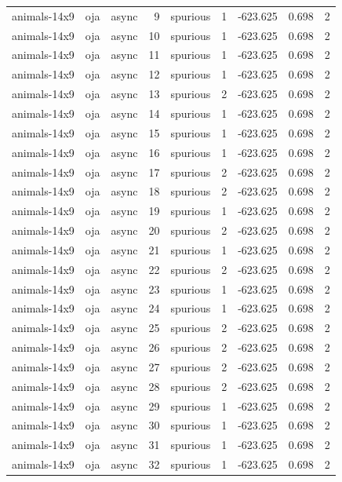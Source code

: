 \begin{tabular}{lllrlrrrr}
animals-14x9 & oja & async & 9 & spurious & 1 & -623.625 & 0.698 & 2 \\
animals-14x9 & oja & async & 10 & spurious & 1 & -623.625 & 0.698 & 2 \\
animals-14x9 & oja & async & 11 & spurious & 1 & -623.625 & 0.698 & 2 \\
animals-14x9 & oja & async & 12 & spurious & 1 & -623.625 & 0.698 & 2 \\
animals-14x9 & oja & async & 13 & spurious & 2 & -623.625 & 0.698 & 2 \\
animals-14x9 & oja & async & 14 & spurious & 1 & -623.625 & 0.698 & 2 \\
animals-14x9 & oja & async & 15 & spurious & 1 & -623.625 & 0.698 & 2 \\
animals-14x9 & oja & async & 16 & spurious & 1 & -623.625 & 0.698 & 2 \\
animals-14x9 & oja & async & 17 & spurious & 2 & -623.625 & 0.698 & 2 \\
animals-14x9 & oja & async & 18 & spurious & 2 & -623.625 & 0.698 & 2 \\
animals-14x9 & oja & async & 19 & spurious & 1 & -623.625 & 0.698 & 2 \\
animals-14x9 & oja & async & 20 & spurious & 2 & -623.625 & 0.698 & 2 \\
animals-14x9 & oja & async & 21 & spurious & 1 & -623.625 & 0.698 & 2 \\
animals-14x9 & oja & async & 22 & spurious & 2 & -623.625 & 0.698 & 2 \\
animals-14x9 & oja & async & 23 & spurious & 1 & -623.625 & 0.698 & 2 \\
animals-14x9 & oja & async & 24 & spurious & 1 & -623.625 & 0.698 & 2 \\
animals-14x9 & oja & async & 25 & spurious & 2 & -623.625 & 0.698 & 2 \\
animals-14x9 & oja & async & 26 & spurious & 2 & -623.625 & 0.698 & 2 \\
animals-14x9 & oja & async & 27 & spurious & 2 & -623.625 & 0.698 & 2 \\
animals-14x9 & oja & async & 28 & spurious & 2 & -623.625 & 0.698 & 2 \\
animals-14x9 & oja & async & 29 & spurious & 1 & -623.625 & 0.698 & 2 \\
animals-14x9 & oja & async & 30 & spurious & 1 & -623.625 & 0.698 & 2 \\
animals-14x9 & oja & async & 31 & spurious & 1 & -623.625 & 0.698 & 2 \\
animals-14x9 & oja & async & 32 & spurious & 1 & -623.625 & 0.698 & 2 \\

\end{tabular}

